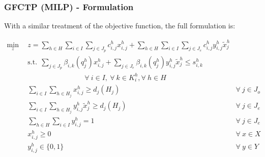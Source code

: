 \begin{frame}[ctb!]
  \frametitle{GFCTP (MILP) - Formulation} 
  
  With a similar treatment of the objective function, the full formulation is:
  
  \begin{subequations}\label{eqs:GFCTP-E}
    \begin{align}
      \label{eq:GRCTP-E_obj}
      \min_{z} \:\: 
      & 
      z = \sum_{h \in H}\sum_{i \in I}\sum_{j \in J_{p}}c_{i,j}^{h} x_{i,j}^{h} 
      + \sum_{h \in H}\sum_{i \in I}\sum_{j \in J_{e}}c_{i,j}^{h} y_{i,j}^{h} \tilde{x}_{j}^{h}
      && \\
      \label{eq:GRCTP-E_sup}
      &
      \text{s.t.} \:\: 
      \sum_{j \in J_{p}}\beta_{i,k}(q_{j}^{h}) x_{i,j}^{h}
      + \sum_{j \in J_{e}}\beta_{i,k}(q_{j}^{h}) y_{i,j}^{h} \tilde{x}_{j}^{h} \leq s_{i,k}^{h} \nonumber \\
      &
      \qquad\qquad\qquad\qquad
      \forall \: i \in I, \: \forall \: k \in K_{i}^{h}, \forall \: {h \in H}\\
      \label{eq:GRCTP-E_dem_p}
      &
      \sum_{i \in I}\sum_{h \in H_{j}} x_{i,j}^{h} \geq d_{j}(H_{j})
      &
      \forall \: j \in J_{o} &\\
      \label{eq:GRCTP-E_dem_e}
      &
      \sum_{i \in I}\sum_{h \in H_{j}} y_{i,j}^{h} \tilde{x}_{j}^{h} \geq d_{j}(H_{j}) 
      &
      \forall \: j \in J_{e}  &\\
      \label{eq:GRCTP-E_sumy}
      &
      \sum_{h \in H}\sum_{i \in I} y_{i,j}^{h} = 1
      &
      \forall \: j \in J_{e}  &\\
      \label{eq:GRCTP-E_x}
      &
      x_{i,j}^{h} \geq 0
      &
      \forall \: x \in X  &\\
      \label{eq:GRCTP-E_y}
      &
      y_{i,j}^{h} \in \{0,1\}
      &
      \forall \: y \in Y &
    \end{align}
  \end{subequations}

\end{frame}

